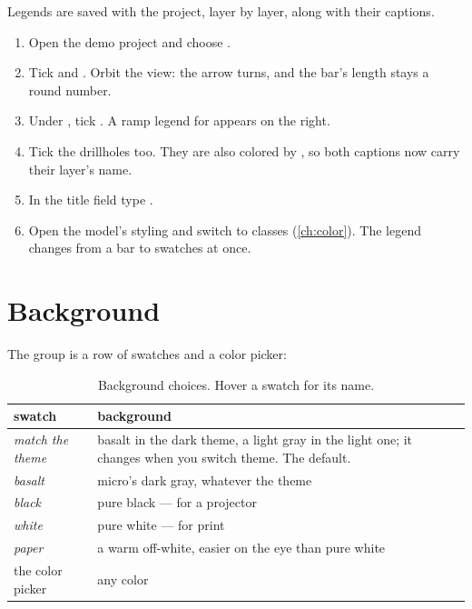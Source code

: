 Legends are saved with the project, layer by layer, along with their captions.

\begin{tryit}
\begin{enumerate}
\item Open the demo project and choose .
\item Tick  and . Orbit the view: the arrow turns, and the bar's length stays a round number.
\item Under , tick . A ramp legend for  appears on the right.
\item Tick the drillholes too. They are also colored by , so both captions now carry their layer's name.
\item In the title field type .
\item Open the model's styling and switch  to classes (\cref{ch:color}). The legend changes from a bar to swatches at once.
\end{enumerate}
\end{tryit}

\section{Background}\label{sec:figures-bg}

The  group is a row of swatches and a color picker:

\begin{table}[htbp]\small
\begin{tabularx}{\linewidth}{@{}lL@{}}\toprule
swatch & background \\ \midrule
\emph{match the theme} & basalt in the dark theme, a light gray in the light one; it changes when you switch theme. The default. \\
\emph{basalt} & micro's dark gray, whatever the theme \\
\emph{black} & pure black — for a projector \\
\emph{white} & pure white — for print \\
\emph{paper} & a warm off-white, easier on the eye than pure white \\
the color picker & any color \\ \bottomrule
\end{tabularx}
\caption{Background choices. Hover a swatch for its name.}\label{tab:figures-bg}
\end{table}

